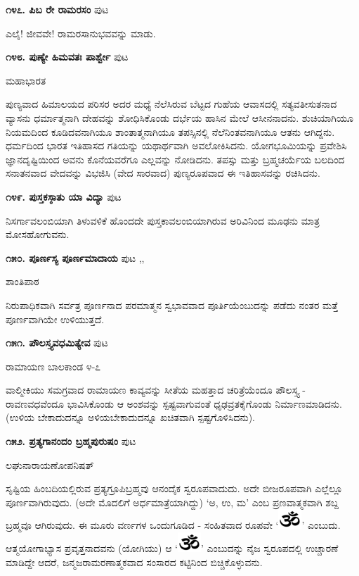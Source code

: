 {\medskip
\noindent\textbf{೧೪೭. ಪಿಬ ರೇ ರಾಮರಸಂ} \hfill ಪುಟ \pageref{187}

ಎಲೈ! ಜೀವವೇ! ರಾಮರಸಾನುಭವವನ್ನು ಮಾಡು. 

\medskip
\noindent\textbf{೧೪೮. ಪುಣ್ಯೇ ಹಿಮವತಃ ಪಾರ್ಶ್ವೇ} \hfill ಪುಟ \pageref{118}

\hfill ಮಹಾಭಾರತ

ಪುಣ್ಯವಾದ ಹಿಮಾಲಯದ ಪರಿಸರ ಅದರ ಮಧ್ಯೆ ನೆಲೆಸಿರುವ ಬೆಟ್ಟದ ಗುಹೆಯ ಆವಾಸದಲ್ಲಿ ಸತ್ಯವತೀಸುತನಾದ ವ್ಯಾಸನು ಧರ್ಮಾತ್ಮನಾಗಿ ದೇಹವನ್ನು ಶೋಧಿಸಿಕೊಂಡು ದರ್ಭೆಯ ಹಾಸಿನ ಮೇಲೆ ಆಸೀನನಾದನು. ಶುಚಿಯಾಗಿಯೂ ನಿಯಮದಿಂದ ಕೂಡಿದವನಾಗಿಯೂ ಶಾಂತಾತ್ಮನಾಗಿಯೂ ತಪಸ್ಸಿನಲ್ಲಿ ನೆಲೆನಿಂತವನಾಗಿಯೂ ಆತನು ಆಗಿದ್ದನು. ಧರ್ಮದಿಂದ ಭಾರತ ಇತಿಹಾಸದ ಗತಿಯನ್ನು ಯಥಾರ್ಥವಾಗಿ ಅವಲೋಕಿಸಿದನು. ಯೋಗಭೂಮಿಯನ್ನು ಪ್ರವೇಶಿಸಿ ಜ್ಞಾನದೃಷ್ಟಿಯಿಂದ ಅವನು ಕೊನೆಯವರೆಗೂ ಎಲ್ಲವನ್ನು ನೋಡಿದನು. ತಪಸ್ಸು ಮತ್ತು ಬ್ರಹ್ಮಚರ್ಯೆಯ ಬಲದಿಂದ ಸನಾತನವಾದ ವೇದವನ್ನು ವಿಭಜಿಸಿ (ವೇದ ಸಾರವಾದ) ಪುಣ್ಯರೂಪವಾದ ಈ ಇತಿಹಾಸವನ್ನು ರಚಿಸಿದನು.

\medskip
\noindent\textbf{೧೪೯. ಪುಸ್ತಕಸ್ಠಾತು ಯಾ ವಿದ್ಯಾ} \hfill ಪುಟ \pageref{114}

ನಿಸರ್ಗಾವಲಂಬಿಯಾಗಿ ತಿಳುವಳಿಕೆ ಹೊಂದದೇ ಪುಸ್ತಕಾವಲಂಬಿಯಾಗಿರುವ ಅರಿವಿನಿಂದ ಮೂಢನು ಮಾತ್ರ ಮೋಸಹೋಗುವನು.

\medskip
\noindent\textbf{೧೫೦. ಪೂರ್ಣಸ್ಯ ಪೂರ್ಣಮಾದಾಯ} \hfill ಪುಟ \pageref{23},\pageref{48a},\pageref{268}

\hfill ಶಾಂತಿಪಾಠ

ನಿರುಪಾಧಿಕವಾಗಿ ಸರ್ವತ್ರ ಪೂರ್ಣನಾದ ಪರಮಾತ್ಮನ ಸ್ವಭಾವವಾದ ಪೂರ್ತಿಯೆಂಬುದನ್ನು ಪಡೆದು ನಂತರ ಮತ್ತೆ ಪೂರ್ಣವಾಗಿಯೇ ಉಳಿಯುತ್ತದೆ.

\medskip
\noindent\textbf{೧೫೧. ಪೌಲಸ್ತ್ಯವಧಮಿತ್ಯೇವ} \hfill ಪುಟ \pageref{207c}

\hfill ರಾಮಾಯಣ ಬಾಲಕಾಂಡ ೪-೭

ವಾಲ್ಮೀಕಿಯು ಸಮಗ್ರವಾದ ರಾಮಾಯಣ ಕಾವ್ಯವನ್ನು ಸೀತೆಯ ಮಹತ್ತಾದ ಚರಿತ್ರೆಯೆಂದೂ ಪೌಲಸ್ತ್ಯ - ರಾವಣವಧವೆಂದೂ ಭಾವಿಸಿಕೊಂಡು ಆ ಅಂಶವನ್ನು ಸ್ಪಷ್ಟವಾಗುವಂತೆ ಧೃಢವ್ರತಕೈಗೊಂಡು ನಿರ್ಮಾಣಮಾಡಿದನು. (ಉಳಿಯ ಬೇಕಾದುದನ್ನೂ ಅಳಿಯಬೇಕಾದುದನ್ನೂ ಖಚಿತವಾಗಿ ಸ್ಪಷ್ಟಗೊಳಿಸಿದನು).

\medskip
\noindent\textbf{೧೫೨. ಪ್ರತ್ಯಗಾನಂದಂ ಬ್ರಹ್ಮಪುರುಷಂ} \hfill ಪುಟ \pageref{106a}

\hfill ಲಘುನಾರಾಯಣೋಪನಿಷತ್

ಸೃಷ್ಟಿಯ ಹಿಂಬದಿಯಲ್ಲಿರುವ ಪ್ರತ್ಯಗ್ರೂಪಿಬ್ರಹ್ಮವು ಆನಂದೈಕ ಸ್ವರೂಪವಾದುದು. ಅದೇ ಬೀಜರೂಪವಾಗಿ ಎಲ್ಲೆಲ್ಲೂ ಪೂರ್ಣವಾಗಿರುವುದು. (ಅದೇ ಮೊದಲಿಗೆ ಅರ್ಧಮಾತ್ರೆಯಾಗಿದ್ದು) `ಅ, ಉ, ಮ' ಎಂಬ ಪ್ರಣವಾತ್ಮಕವಾಗಿ ಶಬ್ದ ಬ್ರಹ್ಮವೂ ಆಗಿರುವುದು. ಈ ಮೂರು ವರ್ಣಗಳ ಒಂದುಗೂಡಿದ - ಸಂಹಿತವಾದ ರೂಪವೇ `\includegraphics{Om-PNG.eps}' ಎಂಬುದು. ಆತ್ಮಯೋಗಾಭ್ಯಾಸ ಪ್ರವೃತ್ತನಾದವನು (ಯೋಗಿಯು) ಆ `\includegraphics{Om-PNG.eps}' ಎಂಬುದನ್ನು ನೈಜ ಸ್ವರೂಪದಲ್ಲಿ  ಉಚ್ಚಾರಣೆ ಮಾಡಿದ್ದೇ ಆದರೆ, ಜನ್ಮಜರಾಮರಣಾತ್ಮಕವಾದ ಸಂಸಾರದ ಕಟ್ಟಿನಿಂದ ಬಿಚ್ಚಿಕೊಳ್ಳುವನು. 

}
